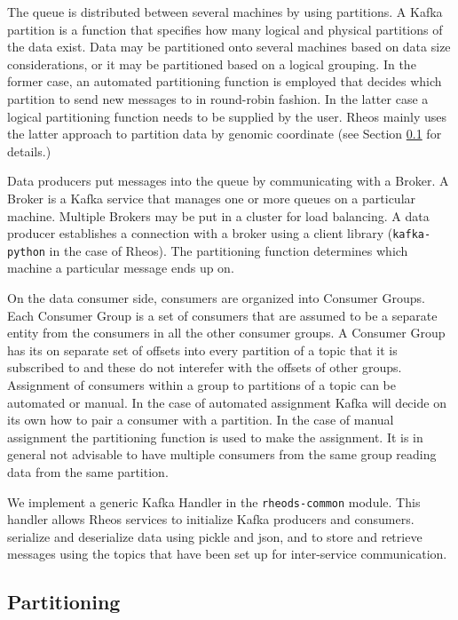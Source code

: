 The queue is distributed between several machines by using partitions. A Kafka partition is a function that specifies how many logical and physical partitions of the data exist. Data may be partitioned onto several machines based on data size considerations, or it may be partitioned based on a logical grouping. In the former case, an automated partitioning function is employed that decides which partition to send new messages to in round-robin fashion. In the latter case a logical partitioning function needs to be supplied by the user. Rheos mainly uses the latter approach to partition data by genomic coordinate (see Section \ref{sec:main_body_partitioning} for details.)

Data producers put messages into the queue by communicating with a Broker. A Broker is a Kafka service that manages one or more queues on a particular machine. Multiple Brokers may be put in a cluster for load balancing. A data producer establishes a connection with a broker using a client library (\texttt{kafka-python} in the case of Rheos). The partitioning function determines which machine a particular message ends up on.

On the data consumer side, consumers are organized into Consumer Groups. Each Consumer Group is a set of consumers that are assumed to be a separate entity from the consumers in all the other consumer groups. A Consumer Group has its on separate set of offsets into every partition of a topic that it is subscribed to and these do not interefer with the offsets of other groups. Assignment of consumers within a group to partitions of a topic can be automated or manual. In the case of automated assignment Kafka will decide on its own how to pair a consumer with a partition. In the case of manual assignment the partitioning function is used to make the assignment. It is in general not advisable to have multiple consumers from the same group reading data from the same partition. 

We implement a generic Kafka Handler in the \texttt{rheods-common} module. This handler allows Rheos services to initialize Kafka producers and consumers. serialize and deserialize data using pickle and json, and to store and retrieve messages using the topics that have been set up for inter-service communication.

\subsection{Partitioning} \label{sec:main_body_partitioning}

